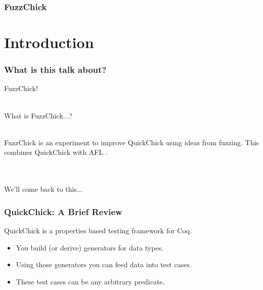\documentclass{beamer}
\author{
  Beck, Calvin \and Huang, Jiani \and Li, Yishuai
}
\begin{document}
\begin{frame}
  \frametitle{FuzzChick}
  \maketitle
\end{frame}

\section{Introduction}

\begin{frame}
  \frametitle{What is this talk about?}

  \pause

  {\huge FuzzChick!}\\~\\

  \pause

  What is FuzzChick...? \cite{fuzzchick} \\~\\

  \pause

  FuzzChick is an experiment to improve QuickChick using ideas from
  fuzzing. This combines QuickChick with AFL \cite{AFL}.\\~\\~\\

  \pause

  {\huge We'll come back to this...}\\

\end{frame}

\begin{frame}
  \frametitle{QuickChick: A Brief Review}

  QuickChick is a properties based testing framework for Coq. \\

  \begin{itemize}
  \item You build (or derive) generators for data types.
  \item Using those generators you can feed data into test cases.
  \item These test cases can be any arbitrary predicate.
  \end{itemize}
\end{frame}
\end{document}
